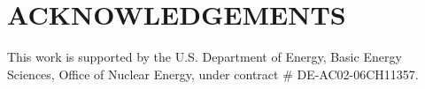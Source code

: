 \section*{ACKNOWLEDGEMENTS}
This work is supported by the U.S. Department of Energy, Basic Energy Sciences, 
Office of Nuclear Energy, under contract \# DE-AC02-06CH11357.
